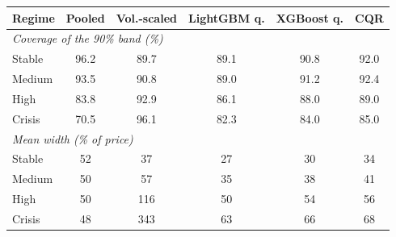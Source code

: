 \begin{tabular}{lccccc}
\toprule
Regime & Pooled & Vol.-scaled & LightGBM q. & XGBoost q. & CQR\\
\midrule
\multicolumn{6}{l}{\emph{Coverage of the 90\% band (\%)}}\\
Stable & 96.2 & 89.7 & 89.1 & 90.8 & 92.0\\
Medium & 93.5 & 90.8 & 89.0 & 91.2 & 92.4\\
High & 83.8 & 92.9 & 86.1 & 88.0 & 89.0\\
Crisis & 70.5 & 96.1 & 82.3 & 84.0 & 85.0\\
\multicolumn{6}{l}{\emph{Mean width (\% of price)}}\\
Stable & 52 & 37 & 27 & 30 & 34\\
Medium & 50 & 57 & 35 & 38 & 41\\
High & 50 & 116 & 50 & 54 & 56\\
Crisis & 48 & 343 & 63 & 66 & 68\\
\bottomrule
\end{tabular}
